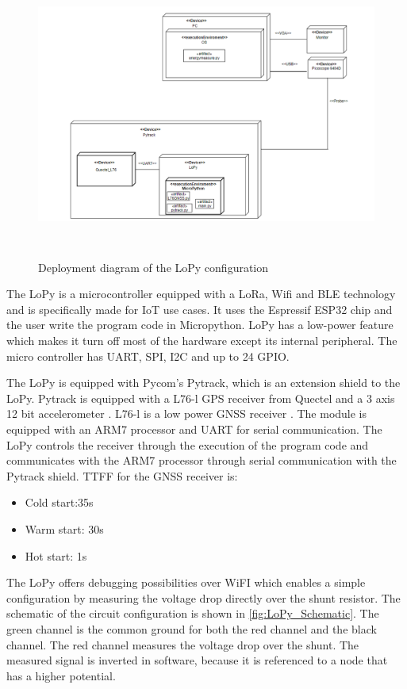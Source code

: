 \begin{figure}[H]
\centering
\includegraphics[height=9.5cm]{Project_Report/Images/LoPy_deploy.png}
\caption{Deployment diagram of the LoPy configuration}
\label{fig:LoPy_deploy}
\end{figure}

The LoPy is a microcontroller equipped with a LoRa, Wifi and BLE technology \cite{LoPy} and is specifically made for IoT use cases. It uses the Espressif ESP32 chip and the user write the program code in Micropython. LoPy has a low-power feature which makes it turn off most of the hardware except its internal peripheral. The micro controller has UART, SPI, I2C and up to 24 GPIO.

The LoPy is equipped with Pycom's Pytrack, which is an extension shield to the LoPy. Pytrack is equipped with a L76-l GPS receiver from Quectel and a 3 axis 12 bit accelerometer \cite{Pytrack}. L76-l is a low power GNSS receiver \cite{L76}. The module is equipped with an ARM7 processor and UART for serial communication. The LoPy controls the receiver through the execution of the program code and communicates with the ARM7 processor through serial communication with the Pytrack shield. TTFF for the GNSS receiver is:
\begin{itemize}
\item Cold start:35s
\item Warm start: 30s
\item Hot start: 1s


\end{itemize}


The LoPy offers debugging possibilities over WiFI which enables a simple configuration by measuring the voltage drop directly over the shunt resistor. The schematic of the circuit configuration is shown in \ref{fig:LoPy_Schematic}. The green channel is the common ground for both the red channel and the black channel. The red channel measures the voltage drop over the shunt. The measured signal is inverted in software, because it is referenced to a node that has a higher potential. 

